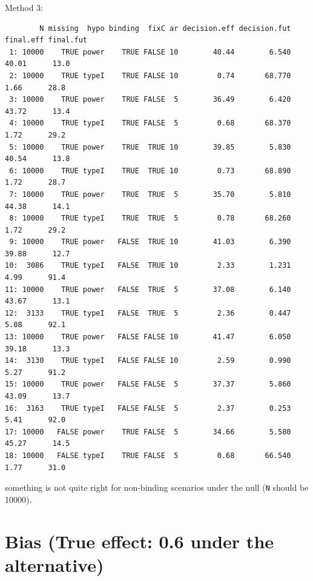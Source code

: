 \documentclass[12pt]{article}
\newcommand\Warning[1][3ex]{%
\renewcommand\stacktype{L}%
\scaleto{\stackon[1.3pt]{\color{red}$\triangle$}{\tiny\bfseries !}}{#1}%
\xspace
}
\begin{document}
Method 3:
\begin{verbatim}
        N missing  hypo binding  fixC ar decision.eff decision.fut final.eff final.fut
 1: 10000    TRUE power    TRUE FALSE 10        40.44        6.540     40.01      13.0
 2: 10000    TRUE typeI    TRUE FALSE 10         0.74       68.770      1.66      28.8
 3: 10000    TRUE power    TRUE FALSE  5        36.49        6.420     43.72      13.4
 4: 10000    TRUE typeI    TRUE FALSE  5         0.68       68.370      1.72      29.2
 5: 10000    TRUE power    TRUE  TRUE 10        39.85        5.830     40.54      13.8
 6: 10000    TRUE typeI    TRUE  TRUE 10         0.73       68.890      1.72      28.7
 7: 10000    TRUE power    TRUE  TRUE  5        35.70        5.810     44.38      14.1
 8: 10000    TRUE typeI    TRUE  TRUE  5         0.78       68.260      1.72      29.2
 9: 10000    TRUE power   FALSE  TRUE 10        41.03        6.390     39.88      12.7
10:  3086    TRUE typeI   FALSE  TRUE 10         2.33        1.231      4.99      91.4
11: 10000    TRUE power   FALSE  TRUE  5        37.08        6.140     43.67      13.1
12:  3133    TRUE typeI   FALSE  TRUE  5         2.36        0.447      5.08      92.1
13: 10000    TRUE power   FALSE FALSE 10        41.47        6.050     39.18      13.3
14:  3130    TRUE typeI   FALSE FALSE 10         2.59        0.990      5.27      91.2
15: 10000    TRUE power   FALSE FALSE  5        37.37        5.860     43.09      13.7
16:  3163    TRUE typeI   FALSE FALSE  5         2.37        0.253      5.41      92.0
17: 10000   FALSE power    TRUE FALSE  5        34.66        5.580     45.27      14.5
18: 10000   FALSE typeI    TRUE FALSE  5         0.68       66.540      1.77      31.0
\end{verbatim}
\Warning something is not quite right for non-binding scenarios under the null (\texttt{N} should be 10000).

\clearpage

\section{Bias (True effect: 0.6 under the alternative)}
\label{sec:org98258a3}

\bigskip
\end{document}
